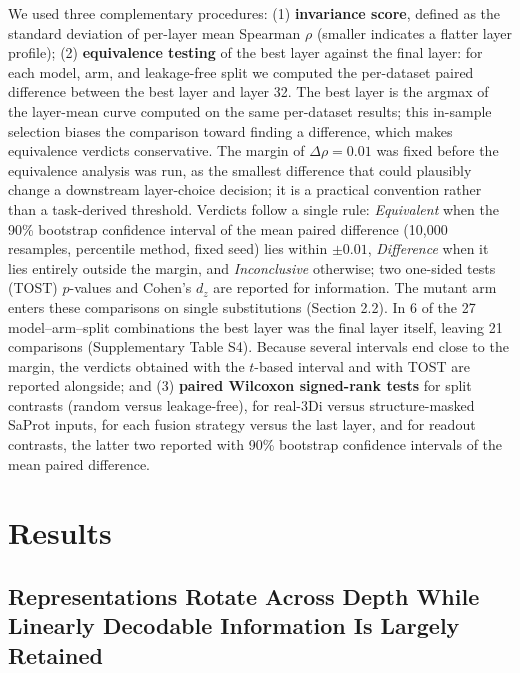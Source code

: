 \documentclass[numbered,webpdf,modern,large]{oup-authoring-template}
\newcommand{\rtwo}[1]{#1}
\newcommand{\rthree}[1]{#1}
\begin{document}
We used three complementary \rtwo{procedures}: (1) \textbf{invariance score}, defined as
the standard deviation of per-layer mean Spearman $\rho$ (smaller indicates a
\rtwo{flatter layer profile});
\rtwo{(2) \textbf{equivalence testing} of the best layer against the final layer: for
each model, arm, and leakage-free split we computed the per-dataset paired difference
between the best layer and layer 32. The best layer is the argmax of the layer-mean
curve computed on the same per-dataset results; this in-sample selection biases the
comparison toward finding a difference, which makes equivalence verdicts conservative.
The margin of $\Delta\rho = 0.01$ was fixed before the equivalence analysis was run, as
the smallest difference that could plausibly change a downstream layer-choice
decision; it is a practical convention rather than a task-derived threshold. Verdicts
follow a single rule: \emph{Equivalent} when the 90\%
bootstrap confidence interval of the mean paired difference (10,000 resamples,
percentile method, fixed seed) lies within $\pm 0.01$, \emph{Difference} when it lies
entirely outside the margin, and \emph{Inconclusive} otherwise; two one-sided tests
(TOST) $p$-values and Cohen's $d_z$ are reported for information. \rthree{The mutant arm enters these
comparisons on single substitutions (Section 2.2). In 6 of the 27
model--arm--split combinations the best layer was the final layer itself, leaving 21
comparisons (Supplementary Table S4). Because several intervals end close to the
margin, the verdicts obtained with the $t$-based interval and with TOST are reported
alongside;}} and (3) \textbf{paired Wilcoxon signed-rank tests}
for split contrasts (random versus leakage-free)\rtwo{,} for real-3Di versus
structure-masked SaProt inputs\rtwo{, for each fusion strategy versus the last layer,
and for readout contrasts, the latter two reported with 90\% bootstrap confidence
intervals of the mean paired difference}.

\section{Results}

\subsection{\rtwo{Representations Rotate Across Depth While Linearly Decodable Information Is Largely Retained}}
\end{document}
